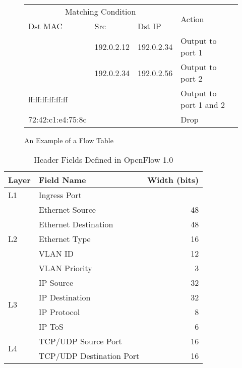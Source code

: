 \begin{figure}
\centering
\begin{tabular}{@{}lllll@{}}
\toprule
\multicolumn{3}{c}{Matching Condition} & \multirow{2}{*}{Action} \\ \cmidrule(){1-3}
Dst MAC     & Src     & Dst IP    &                         \\ \midrule
                  & 192.0.2.12 & 192.0.2.34  & Output to port 1         \\
                  & 192.0.2.34 & 192.0.2.56  & Output to port 2         \\
ff:ff:ff:ff:ff:ff &            &             & Output to port 1 and 2   \\
72:42:c1:e4:75:8c &            &             & Drop                     \\
\bottomrule
\end{tabular}
\caption{An Example of a Flow Table}%
\label{tbl:flow-table}
\end{figure}

\begin{table}
\centering
\caption{Header Fields Defined in OpenFlow 1.0}%
\label{tbl:flow-fields}
\begin{tabular}{@{}llr@{}}
\toprule
Layer               & Field Name               & Width (bits) \\ \midrule
L1                  & Ingress Port             &              \\ \cmidrule(l){2-3}
\multirow{5}{*}{L2} & Ethernet Source          & 48           \\
                    & Ethernet Destination     & 48           \\
                    & Ethernet Type            & 16           \\
                    & VLAN ID                  & 12           \\
                    & VLAN Priority            & 3            \\ \cmidrule(l){2-3}
\multirow{4}{*}{L3} & IP Source                & 32           \\
                    & IP Destination           & 32           \\
                    & IP Protocol              & 8            \\
                    & IP ToS                   & 6            \\ \cmidrule(l){2-3}
\multirow{2}{*}{L4} & TCP/UDP Source Port      & 16           \\
                    & TCP/UDP Destination Port & 16           \\ \bottomrule
\end{tabular}
\end{table}

